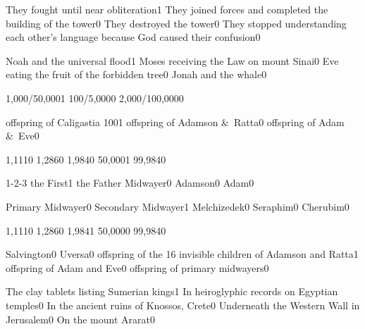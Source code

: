 {They fought until near obliteration}{1}
{They joined forces and completed the building of the tower}{0}
{They destroyed the tower}{0}
{They stopped understanding each other's language because God caused their confusion}{0}
\qstop

{Noah and the universal flood}{1}
{Moses receiving the Law on mount Sinai}{0}
{Eve eating the fruit of the forbidden tree}{0}
{Jonah and the whale}{0}
\qstop

{1,000/50,000}{1}
{100/5,000}{0}
{2,000/100,000}{0}
\qstop

{offspring of Caligastia 100}{1}
{offspring of Adamson \&\ Ratta}{0}
{offspring of Adam \&\ Eve}{0}
\qstop

{1,111}{0}
{1,286}{0}
{1,984}{0}
{50,000}{1}
{99,984}{0}
\qstop

{1-2-3 the First}{1}
{the Father Midwayer}{0}
{Adamson}{0}
{Adam}{0}
\qstop

{Primary Midwayer}{0}
{Secondary Midwayer}{1}
{Melchizedek}{0}
{Seraphim}{0}
{Cherubim}{0}
\qstop

{1,111}{0}
{1,286}{0}
{1,984}{1}
{50,000}{0}
{99,984}{0}
\qstop

{Salvington}{0}
{Uversa}{0}
{offspring of the 16 invisible children of Adamson and Ratta}{1}
{offspring of Adam and Eve}{0}
{offspring of primary midwayers}{0}
\qstop

{The clay tablets listing Sumerian kings}{1}
{In heiroglyphic records on Egyptian temples}{0}
{In the ancient ruins of Knossos, Crete}{0}
{Underneath the Western Wall in Jerusalem}{0}
{On the mount Ararat}{0}
\qstop


